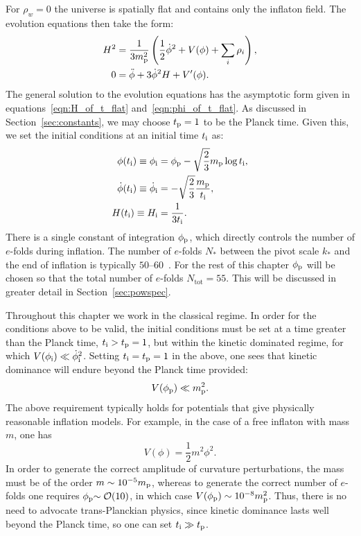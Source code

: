 For \(\rho_w=0\) the universe is spatially flat and contains only the inflaton field. The evolution equations then take the form:
%
\begin{align}
  H^2 
  &= 
  \frac{1}{3m_{\mathrm{p}}^2}
  \left(\frac{1}{2}\dot{\phi}^2 + V(\phi) + \sum_i\rho_i\right),
  \label{eqn:Friedmann_eq} 
  \\
  0
  &= 
  \ddot{\phi} +3\dot{\phi}^2H + V^\prime(\phi).
  \label{eqn:Motion_eq_Scalar}
\end{align}
%
The general solution to the evolution equations has the asymptotic form given in equations~\eqref{eqn:H_of_t_flat} and~\eqref{eqn:phi_of_t_flat}. As discussed in Section~\ref{sec:constants}, we may choose \(t_{\mathrm{p}}=1\) to be the Planck time. Given this, we set the initial conditions at an initial time \(t_{\mathrm{i}}\) as:
%
\begin{align}
  \phi(t_{\mathrm{i}}) \equiv \phi_{\mathrm{i}}
  &= 
  \phi_{\mathrm{p}} - \sqrt{\frac{2}{3}}m_{\mathrm{p}}\log t_{\mathrm{i}}, 
  \label{eqn:phi_ic}
  \\
  \dot\phi(t_{\mathrm{i}}) 
  \equiv 
  \dot\phi_{\mathrm{i}}
  &= 
  -\sqrt{\frac{2}{3}}\frac{m_{\mathrm{p}}}{t_{\mathrm{i}}}, 
  \label{eqn:phid_ic}
  \\
  H(t_{\mathrm{i}}) 
  \equiv 
  H_{\mathrm{i}}
  &= 
  \frac{1}{3t_{\mathrm{i}}}. 
  \label{eqn:H_ic}
\end{align}
There is a single constant of integration \(\phi_{\mathrm{p}}\), which directly controls the number of \(e\)-folds during inflation. The number of \(e\)-folds \(N_*\) between the pivot scale \(k_*\) and the end of inflation is typically \(50\)--\(60\)~\citep{planck_collaboration_planck_2013-1}. For the rest of this chapter \(\phi_{\mathrm{p}}\) will be chosen so that the total number of \(e\)-folds \(N_\mathrm{tot}=55\). This will be discussed in greater detail in Section~\ref{sec:powspec}.

Throughout this chapter we work in the classical regime. In order for the conditions above to be valid, the initial conditions must be set at a time greater than the Planck time, \(t_{\mathrm{i}} >t_{\mathrm{p}}=1\), but within the kinetic dominated regime, for which \(V(\phi_{\mathrm{i}}) \ll \dot\phi_{\mathrm{i}}^2\). Setting \(t_{\mathrm{i}}=t_{\mathrm{p}}=1\) in the above, one sees that kinetic dominance will endure beyond the Planck time provided:
%
\begin{equation}
  V(\phi_{\mathrm{p}}) \ll m_{\mathrm{p}}^2.
\end{equation}
%
The above requirement typically holds for potentials that give physically reasonable inflation models. For example, in the case of a free inflaton with mass \(m\), one has \[ V(\phi) = \frac{1}{2}m^2 \phi^2.\] In order to generate the correct amplitude of curvature perturbations, the mass must be of the order \(m\sim10^{-5}m_{\mathrm{p}}\), whereas to generate the correct number of \(e\)-folds one requires \(\phi_{\mathrm{p}}{\sim\mathcal{O}{\left(10\right)}}\), in which case \(V(\phi_{\mathrm{p}}) \sim 10^{-8} m_{\mathrm{p}}^2\).  Thus, there is no need to advocate trans-Planckian physics, since kinetic dominance lasts well beyond the Planck time, so one can set \(t_{\mathrm{i}} \gg t_{\mathrm{p}}\).


